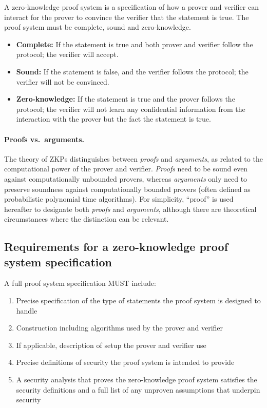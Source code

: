	
	A zero-knowledge proof system is a specification of how a prover and verifier 
can interact for the prover to convince the verifier that the statement is true.
    The proof system must be complete, sound and zero-knowledge.
\begin{itemize}
\item \textbf{Complete:} If the statement is true and both prover and verifier follow the protocol; the verifier will accept.
\item \textbf{Sound:} If the statement is false, and the verifier follows the protocol; the verifier will not be convinced.
\item \textbf{Zero-knowledge:} If the statement is true and the prover follows the protocol; the verifier will not learn any confidential information from the interaction with the prover but the fact the statement is true.
\end{itemize}


\paragraph{Proofs vs.\ arguments.}
	The theory of ZKPs distinguishes between \emph{proofs} and \emph{arguments}, 
as related to the computational power of the prover and verifier.
	\emph{Proofs} need to be sound even against computationally unbounded provers, 
whereas \emph{arguments} only need to preserve soundness against computationally bounded
provers (often defined as probabilistic polynomial time algorithms).
	For simplicity, ``proof'' is used hereafter to designate both 
\emph{proofs} and \emph{arguments}, although there are theoretical 
circumstances where the distinction can be relevant.


\subsection[Requirements for a ZK proof system specification]{Requirements for a zero-knowledge proof system specification}
\label{security:intro:requirements-ZK}

A full proof system specification MUST include:
\begin{enumerate}
\item Precise specification of the type of statements the proof system is designed to handle
\item Construction including algorithms used by the prover and verifier
\item If applicable, description of setup the prover and verifier use
\item Precise definitions of security the proof system is intended to provide
\item A security analysis that proves the zero-knowledge proof system satisfies the security definitions and a full list of any unproven assumptions that underpin security
\end{enumerate}

